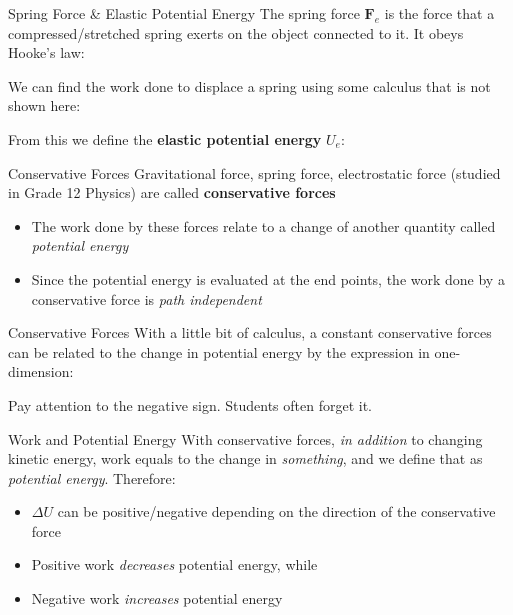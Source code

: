\documentclass[12pt,compress,aspectratio=169]{beamer}
\begin{document}
\begin{frame}{Spring Force \& Elastic Potential Energy}
  The spring force $\bm{F}_e$ is the force that a compressed/stretched spring
  exerts on the object connected to it. It obeys Hooke's law:
    

  \vspace{-.1in}We can find the work done to displace a spring using some
  calculus that is not shown here:

  
  From this we define the \textbf{elastic potential energy} $U_e$:

\end{frame}



\begin{frame}{Conservative Forces}
  Gravitational force, spring force, electrostatic force (studied in Grade 12
  Physics) are called \textbf{conservative forces}
  \begin{itemize}
  \item The work done by these forces relate to a change of another quantity
    called \emph{potential energy}
  \item Since the potential energy is evaluated at the end points, the work
    done by a conservative force is \emph{path independent}
  \end{itemize}
\end{frame}



\begin{frame}{Conservative Forces}
  With a little bit of calculus, a constant conservative forces can be related
  to the change in potential energy by the expression in one-dimension:


  Pay attention to the negative sign. Students often forget it.
\end{frame}




\begin{frame}{Work and Potential Energy}
  With conservative forces, \emph{in addition} to changing kinetic energy,
  work equals to the change in \emph{something}, and we define that
  as \emph{potential energy}. Therefore:

  \begin{itemize}
  \item\vspace{-.15in}$\Delta U$ can be positive/negative depending on the
    direction of the conservative force
  \item Positive work \emph{decreases} potential energy, while
  \item Negative work \emph{increases} potential energy
  \end{itemize}
\end{frame}
\end{document}
